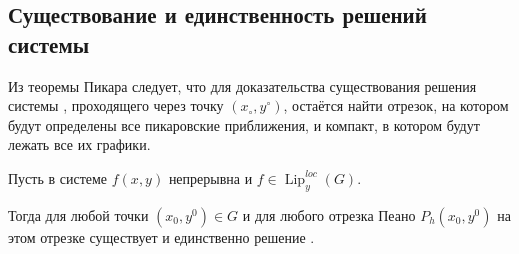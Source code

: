\subsection{Существование и единственность решений системы}

Из теоремы Пикара следует, что для доказательства существования решения системы , проходящего через точку $ (x_\circ, y^\circ) $, остаётся найти отрезок, на котором будут определены все пикаровские приближения, и компакт, в котором будут лежать все их графики.

\begin{theorem}
    Пусть в системе  $ f(x, y) $ непрерывна и $ f \in \operatorname{Lip}_y^{loc}(G) $.

    Тогда для любой точки $ (x_0, y^0) \in G $ и для любого отрезка Пеано $ P_h(x_0, y^0) $ на этом отрезке существует и единственно решение .
\end{theorem}

